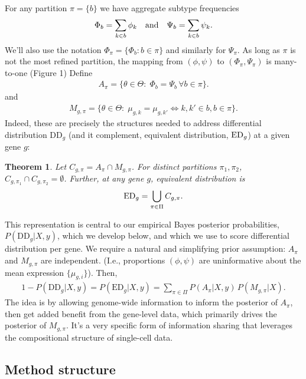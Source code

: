 \documentclass[11pt]{amsart}
\newtheorem{theorem}{Theorem}
\begin{document}
For any partition $\pi=\{b\}$ we have aggregate subtype frequencies
\begin{eqnarray*}
\Phi_b = \sum_{k\in b} \phi_k \quad {\mbox {\rm  and}} \quad 
 \Psi_b = \sum_{k\in b} \psi_k.
\end{eqnarray*}
We'll also use the notation $\Phi_\pi = \{ \Phi_b: b \in \pi \}$ and similarly
for $\Psi_\pi$.   As long as $\pi$ is not the most refined partition,
the mapping from $( \phi, \psi )$ to $( \Phi_\pi, \Psi_\pi)$ is many-to-one (Figure 1)
Define
\begin{eqnarray*}
A_\pi = \{ \theta\in \Theta: \; \Phi_b = \Psi_b  \, \forall b \in \pi \}.
\end{eqnarray*}
and
\begin{eqnarray*}
M_{g,\pi} = \{ \theta \in \Theta: \; \mu_{g,k} = \mu_{g,k'} \iff k,k' \in b, b \in \pi \}.
\end{eqnarray*}
Indeed, these are precisely the
structures needed to address differential distribution DD$_g$ (and
it complement, equivalent distribution, ${\rm ED}_g$) at a given gene
$g$: 

\begin{theorem}  Let $C_{g,\pi} = A_\pi\cap M_{g, \pi}$.  For distinct 
partitions $\pi_1,\pi_2$, $C_{g,\pi_1} \cap C_{g,\pi_2} = \emptyset$. Further,
 at any gene $g$, equivalent distribution is
\begin{eqnarray*}
{\rm{ED}}_g = \bigcup_{\pi \in \Pi} C_{g,\pi}.
\end{eqnarray*}
\end{theorem}
 
This representation is central to our empirical Bayes
posterior probabilities, $P(\text{DD}_g|X,y)$, which we develop below, and
which we use to score differential distribution per gene. We require a natural
and simplifying prior assumption:  $A_\pi$ and $M_{g,\pi}$ are independent.
(I.e., proportions $(\phi,\psi)$ are uninformative about the mean expression
  $\{\mu_{g,i}\}$). Then,
\begin{align}
1-P(\text{DD}_g|X,y) = P(\text{ED}_g|X,y) = \sum_{\pi \in \Pi} P(A_\pi|X,y) \,
P(M_{g,\pi}|X).
\end{align}
The idea is by allowing genome-wide information to inform the posterior of $A_\pi$, then get added benefit from the gene-level data, which primarily drives the posterior of $M_{g,\pi}$. It's a very specific form of information sharing that leverages the compositional structure of single-cell data. 

\subsection{Method structure}
\end{document}
